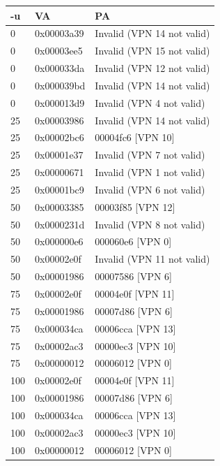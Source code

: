 \documentclass[12pt]{article}
\begin{document}
\begin{tabular}{p{3cm}p{6cm}p{6cm}}  %
    \toprule[2pt]
    -u & VA & PA  \\ %
    \midrule[2pt]
    0    & 0x00003a39       & Invalid (VPN 14 not valid)               \\
    0    & 0x00003ee5       & Invalid (VPN 15 not valid)              \\
    0    & 0x000033da   & Invalid (VPN 12 not valid)              \\
    0    & 0x000039bd   & Invalid (VPN 14 not valid)               \\
    0    & 0x000013d9       & Invalid (VPN 4 not valid)               \\
    25    & 0x00003986       & Invalid (VPN 14 not valid)              \\
    25    & 0x00002bc6   & 00004fc6 [VPN 10]             \\
    25   & 0x00001e37   & Invalid (VPN 7 not valid)               \\
    25   & 0x00000671      & Invalid (VPN 1 not valid)               \\
    25    & 0x00001bc9       & Invalid (VPN 6 not valid)              \\
    50    & 0x00003385   & 00003f85 [VPN 12]               \\
    50    & 0x0000231d   & Invalid (VPN 8 not valid)               \\
    50    & 0x000000e6   & 000060e6 [VPN 0]               \\
    50    & 0x00002e0f   & Invalid (VPN 11 not valid)               \\
    50    & 0x00001986   & 00007586 [VPN 6]               \\
    75    & 0x00002e0f   & 00004e0f [VPN 11]               \\
    75    & 0x00001986   & 00007d86 [VPN 6]               \\
    75    & 0x000034ca   & 00006cca [VPN 13]               \\
    75    & 0x00002ac3   & 00000ec3 [VPN 10]               \\
    75    & 0x00000012   & 00006012 [VPN 0]               \\
    100    & 0x00002e0f   & 00004e0f [VPN 11]               \\
    100    & 0x00001986   & 00007d86 [VPN 6]               \\
    100    & 0x000034ca   & 00006cca [VPN 13]               \\
    100    & 0x00002ac3   & 00000ec3 [VPN 10]               \\
    100    & 0x00000012   & 00006012 [VPN 0]               \\
    \bottomrule[2pt]
\end{tabular}\\
\end{document}
